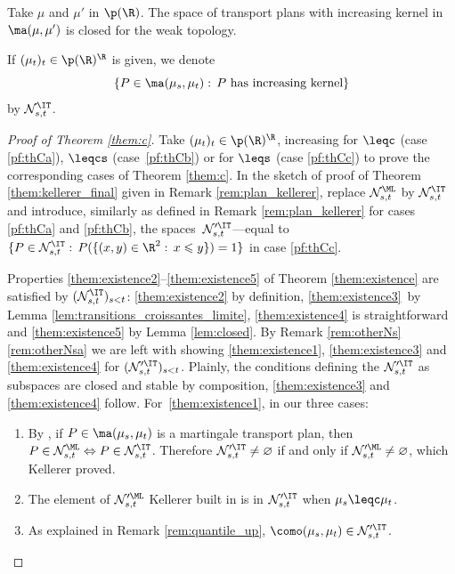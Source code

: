 \begin{lem}\label{lem:transitions_croissantes_limite} Take $\mu$ and $\mu'$ in $\p(\R)$. The space of transport plans with increasing kernel in $\ma(\mu,\mu')$ is closed for the weak topology.
\end{lem}

\begin{notation}\label{nota:Nik}If $(\mu_t)_t\in\p(\R)^\R$ is given, we denote
\[
\{P\in\ma(\mu_s,\mu_t):\,P\text{ has increasing kernel}\}
\]
by $\mathcal{N}^\IT_{s,t}$.
\end{notation}

\begin{proof}[Proof of Theorem \ref{them:c}] Take $(\mu_t)_t\in\p(\R)^\R$, increasing for $\leqc$ (case \eqref{pf:thCa}), $\leqcs$ (case~\eqref{pf:thCb}) or for $\leqs$ (case \eqref{pf:thCc}) to prove the corresponding cases of Theorem \ref{them:c}. In the sketch of proof of Theorem \ref{them:kellerer_final} given in Remark \ref{rem:plan_kellerer}, replace $\mathcal{N}^\ML_{s,t}$ by $\mathcal{N}^\IT_{s,t}$ and introduce, similarly as defined in Remark \ref{rem:plan_kellerer} for cases \eqref{pf:thCa} and \eqref{pf:thCb}, the spaces~$\mathcal{N}_{s,t}'^\IT$---equal to
$\{P\in\mathcal{N}^\IT_{s,t}:\,P(\{(x,y)\in\R^2:\,x\leqslant y\})=1\}$ in case \eqref{pf:thCc}.

Properties \eqref{them:existence2}--\eqref{them:existence5} of Theorem \ref{them:existence} are satisfied by $(\mathcal{N}^\IT_{s,t})_{s<t}$: \eqref{them:existence2} by definition, \eqref{them:existence3}~by Lemma \ref{lem:transitions_croissantes_limite}, \eqref{them:existence4} is straightforward and \eqref{them:existence5} by Lemma \ref{lem:closed}. By Remark \ref{rem:otherNs}\eqref{rem:otherNsa} we are left with showing \eqref{them:existence1}, \eqref{them:existence3} and \eqref{them:existence4} for $(\mathcal{N}_{s,t}'^\IT)_{s<t}$. Plainly, the conditions defining the $\mathcal{N}_{s,t}'^\IT$ as subspaces are closed and stable by composition, \eqref{them:existence3} and \eqref{them:existence4} follow. For~\eqref{them:existence1}, in our three cases:
\begin{enumerate}
\item\label{pf:thCa}
By \cite[\S 3.1]{BHS}, if $P\in\ma(\mu_s,\mu_t)$ is a martingale transport plan, then $P\in\mathcal{N}_{s,t}^\ML\Leftrightarrow P\in\mathcal{N}_{s,t}^\IT$. Therefore $\mathcal{N}_{s,t}'^\IT\neq\varnothing$ if and only if $\mathcal{N}_{s,t}'^\ML\neq\varnothing$, which Kellerer proved.

\item\label{pf:thCb}
The element of $\mathcal{N}_{s,t}'^\ML$ Kellerer built in \cite[Def.\,7 \& Th.\,2]{Ke72} is in $\mathcal{N}_{s,t}'^\IT$ when $\mu_s\leqc\mu_t$.

\item\label{pf:thCc}
As explained in Remark \ref{rem:quantile_up}, $\como(\mu_s,\mu_t)\in \mathcal{N}_{s,t}'^\IT$.\qedhere
\end{enumerate}
\end{proof}

